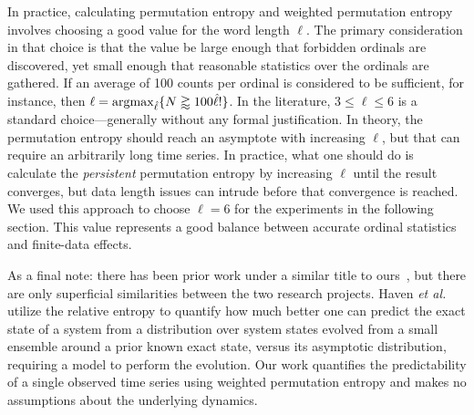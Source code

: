 In practice, calculating permutation entropy and weighted permutation
entropy involves choosing a good value for the word length $\ell$. The
primary consideration in that choice is that the value be large enough
that forbidden ordinals are discovered, yet small enough that
reasonable statistics over the ordinals are gathered.  If an average
of 100 counts per ordinal is considered to be sufficient, for
instance, then $\ell = \operatornamewithlimits{argmax}_{\hat{\ell}} \{
N \gtrapprox 100 \hat{\ell}! \}$.  In the literature, $3 \le \ell \le
6$ is a standard choice---generally without any formal justification.
In theory, the permutation entropy should reach an asymptote with
increasing $\ell$, but that can require an arbitrarily long time
series. In practice, what one should do is calculate the
\emph{persistent} permutation entropy by increasing $\ell$ until the
result converges, but data length issues can intrude before that
convergence is reached.  We used this approach to choose $\ell = 6$
for the experiments in the following section.  This value represents a
good balance between accurate ordinal statistics and finite-data
effects.

As a final note: there has been prior work under a similar title to
ours~\cite{haven2005}, but there are only superficial similarities
between the two research projects.  Haven {\sl et al.} utilize the
relative entropy to quantify how much better one can predict the exact
state of a system from a distribution over system states evolved from 
a small ensemble around a prior known exact state, versus its asymptotic
distribution, requiring a model to perform the evolution. Our work
quantifies the predictability of a single observed time series using
weighted permutation entropy and makes no assumptions about the
underlying dynamics.


